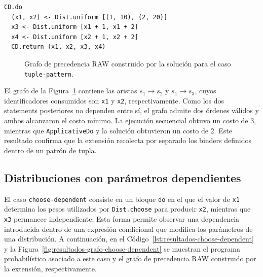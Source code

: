 \begin{lstlisting}[style=haskell,caption={Programa probabilístico asociado al caso \texttt{tuple-pattern}.},label={lst:resultados-tuple-binder}]
CD.do
  (x1, x2) <- Dist.uniform [(1, 10), (2, 20)]
  x3 <- Dist.uniform [x1 + 1, x1 + 2]
  x4 <- Dist.uniform [x2 + 1, x2 + 2]
  CD.return (x1, x2, x3, x4)
\end{lstlisting}

\begin{figure}[ht]
\centering
\begingroup
\begin{PrecedenceGraph}[node distance=0.45cm and 0.55cm]
\end{PrecedenceGraph}
\endgroup
\caption[Grafo RAW del caso \texttt{tuple-pattern}.]{Grafo de precedencia RAW construido por la solución para el caso \texttt{tuple-pattern}.}
\label{fig:resultados-grafo-tuple-binder}
\end{figure}

El grafo de la Figura~\ref{fig:resultados-grafo-tuple-binder} contiene las aristas $s_1\to s_2$ y $s_1\to s_3$, cuyos identificadores consumidos son \texttt{x1} y \texttt{x2}, respectivamente. Como los dos statements posteriores no dependen entre sí, el grafo admite dos órdenes válidos y ambos alcanzaron el costo mínimo. La ejecución secuencial obtuvo un costo de 3, mientras que \texttt{ApplicativeDo} y la solución obtuvieron un costo de 2. Este resultado confirma que la extensión recolecta por separado los binders definidos dentro de un patrón de tupla.

\subsection{Distribuciones con parámetros dependientes}

El caso \texttt{choose-dependent} consiste en un bloque \texttt{do} en el que el valor de \texttt{x1} determina los pesos utilizados por \texttt{Dist.choose} para producir \texttt{x2}, mientras que \texttt{x3} permanece independiente. Esta forma permite observar una dependencia introducida dentro de una expresión condicional que modifica los parámetros de una distribución. A continuación, en el Código~\ref{lst:resultados-choose-dependent} y la Figura~\ref{fig:resultados-grafo-choose-dependent} se muestran el programa probabilístico asociado a este caso y el grafo de precedencia RAW construido por la extensión, respectivamente.

